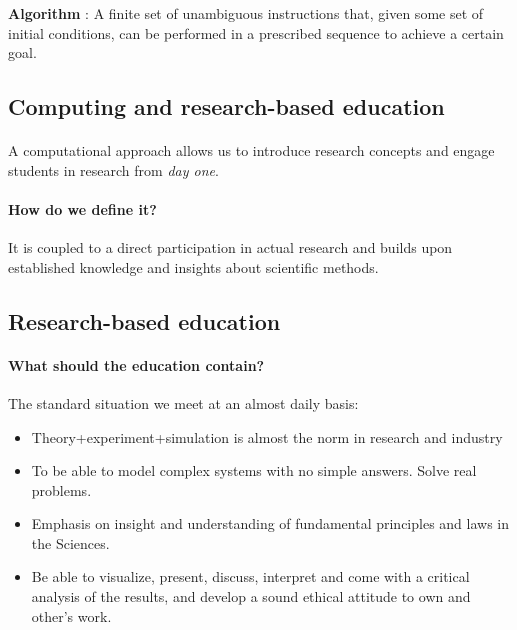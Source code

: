 \documentclass[%
oneside,                 %
final,                   %
10pt]{article}
\begin{document}
\noindent
\textbf{Algorithm} : A finite set of unambiguous instructions that, given some set of initial conditions, can be performed in a prescribed sequence to achieve a certain goal.





\subsection{Computing and research-based education}

\paragraph{}
A computational approach allows us to introduce research concepts and engage students in research from \emph{day one}.



\paragraph{How do we define it?}
It is coupled to a direct participation in actual research and builds upon established
knowledge and insights about scientific methods.





\subsection{Research-based education}

\paragraph{What should the education contain?}
The standard situation we meet at an almost daily basis:

\begin{itemize}
\item Theory+experiment+simulation is almost the norm in research and industry

\item To be able to model complex systems with no simple answers. Solve real problems.

\item Emphasis on insight and understanding of fundamental principles and laws in the Sciences.

\item Be able to visualize, present, discuss, interpret and come with a critical analysis of the results, and develop a sound ethical attitude to own and other's work.
\end{itemize}
\end{document}

